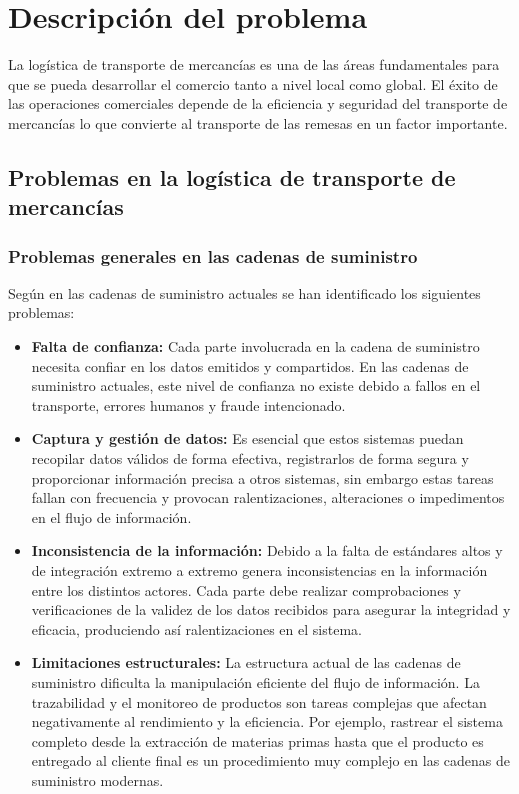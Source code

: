 \raggedbottom
\chapter{Descripción del problema}


La logística de transporte de mercancías es una de las áreas fundamentales para que se pueda desarrollar el comercio tanto a nivel
local como global. El éxito de las operaciones comerciales depende de la eficiencia y seguridad del transporte de mercancías lo que convierte
al transporte de las remesas en un factor importante.\\


\section{Problemas en la logística de transporte de mercancías}
\subsection{Problemas generales en las cadenas de suministro}
Según \textcite{litke2019blockchain} en las cadenas de suministro actuales se han identificado los siguientes problemas:
\begin{itemize}
    \item \textbf{Falta de confianza:} Cada parte involucrada en la cadena de suministro necesita confiar en los datos emitidos y compartidos. En las cadenas 
de suministro actuales, este nivel de confianza no existe debido a fallos en el transporte, errores humanos y fraude intencionado.
    \item \textbf{Captura y gestión de datos:} Es esencial que estos sistemas puedan recopilar datos válidos de forma efectiva, registrarlos de forma segura y proporcionar información precisa a otros sistemas, sin embargo estas tareas fallan con frecuencia y provocan ralentizaciones, alteraciones o impedimentos en el flujo de información.
    \item  \textbf{Inconsistencia de la información:} Debido a la falta de estándares altos y de integración extremo a extremo genera inconsistencias en la información entre los distintos actores. Cada parte debe realizar comprobaciones y verificaciones de la validez de los datos recibidos para asegurar la integridad y eficacia, produciendo así ralentizaciones en el sistema.
    \item \textbf{Limitaciones estructurales:} La estructura actual de las cadenas de suministro dificulta la manipulación eficiente del flujo de información. La trazabilidad y el monitoreo de productos son tareas complejas que afectan negativamente al rendimiento y la eficiencia. Por ejemplo, rastrear el sistema completo desde la extracción de materias primas hasta que el producto es entregado al cliente final es un procedimiento muy complejo en las cadenas de suministro modernas.
\end{itemize}

